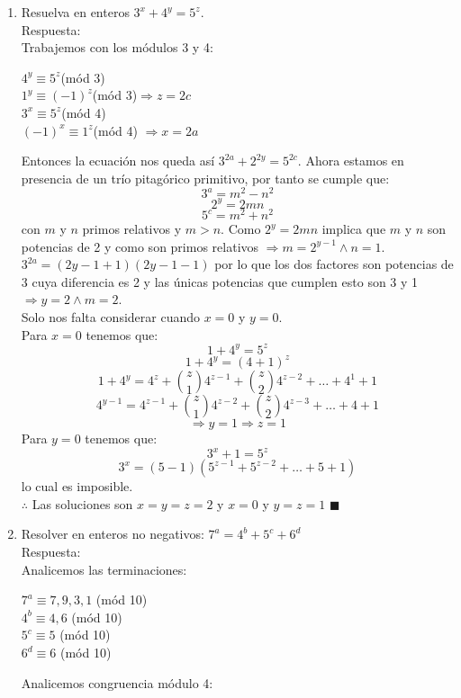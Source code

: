 \documentclass{book}
\begin{document}
\begin{enumerate}
			\item Resuelva en enteros $3^x+4^y=5^z$.\\
			Respuesta:\\
			Trabajemos con los módulos 3 y 4:
			\begin{center}
				$4^y \equiv 5^z$(mód 3) \\
				$1^y \equiv (-1)^z$(mód 3)$ \Rightarrow z= 2c$\\
				$ 3^x \equiv 5^z$(mód 4)\\
				$ (-1)^x \equiv 1^z$(mód 4) $\Rightarrow x= 2a$\\
			\end{center}
				 Entonces la ecuación nos queda así $3^{2a} + 2^{2y} = 5^{2c} $. Ahora estamos en presencia de un trío pitagórico primitivo, por tanto se cumple que: 
$$3^a = m^2 - n^2$$
$$2^y = 2mn$$
$$5^c = m^2 + n^2$$ 
con $m$ y $n$ primos relativos y $m > n$.
Como $2^y = 2mn$ implica que $m$ y $n$ son potencias de 2 y como son primos relativos $\Rightarrow m= 2^{y-1} \wedge n= 1$. \\
$3^{2a} = (2y-1 + 1)(2y-1 - 1)$ por lo que los dos factores son potencias de 3 cuya diferencia es 2 y las únicas potencias que cumplen esto son 3 y 1 $\Rightarrow y= 2\wedge m= 2$.\\
Solo nos falta considerar cuando $x=0$ y $y=0$.\\ 
				Para $x=0$ tenemos que:
				$$1+4^y=5^z$$
				$$1+4^y={(4+1)}^z$$
				$$1+4^y=4^z+{z\choose 1}4^{z-1}+ {z\choose 2}4^{z-2}+\ldots+4^1+1$$
				$$4^{y-1}=4^{z-1}+{z\choose 1}4^{z-2}+ {z\choose 2}4^{z-3}+\ldots+4+1$$
				$$\Rightarrow y=1\Rightarrow z=1$$
				Para $y=0$ tenemos que:
				$$3^x+1=5^z$$
				$$3^x=(5-1)(5^{z-1}+5^{z-2}+\ldots+5+1)$$
				lo cual es imposible.\\
				$\therefore$ Las soluciones son $x=y=z=2$ y $x=0$ y $y=z= 1$ $\blacksquare$ \\
			\item Resolver en enteros no negativos: $7^a=4^b+5^c+6^d$\\
			Respuesta:\\
			Analicemos las terminaciones:
				\begin{center}
					$7^a\equiv 7 ,9 ,3 ,1$ (mód 10)\\
$4^b\equiv 4 ,6$ (mód 10)\\
$5^c\equiv 5$ (mód 10)\\
$6^d\equiv 6$ (mód 10)\\
				\end{center}
Analicemos congruencia módulo 4:
				\begin{center}

\end{center}
\end{enumerate}
\end{document}
